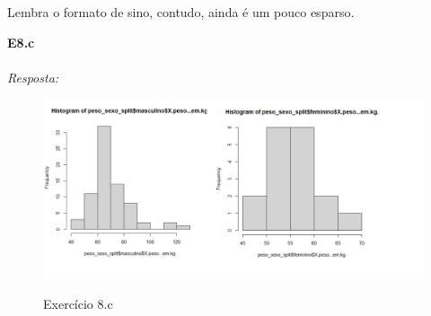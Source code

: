 \documentclass{article}
\begin{document}
    Lembra o formato de sino, contudo, ainda é um pouco esparso.
	
	\textbf {E8.c} 
	\\ \\
	\textit {Resposta:} \\
	
	
	\begin{figure}[h]
		\caption{Exercício 8.c}
		\centering %
		\includegraphics[width=14cm]{8c.png} %
		\label{figura: Item C}
	\end{figure}
	
	
\end{document}
